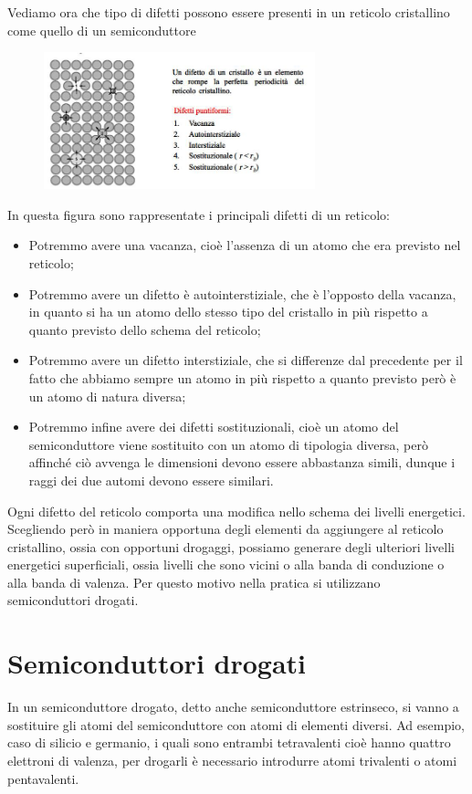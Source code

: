 \vspace{0.2cm}Vediamo ora che tipo di difetti possono essere presenti in un reticolo cristallino come quello di un semiconduttore
\begin{figure}[H]
   \centering
   \includegraphics[width=0.7\textwidth]{immagini/difetti_cristallini.png}
\end{figure}
In questa figura sono rappresentate i principali difetti di un reticolo:
\begin{itemize}[leftmargin=0.5cm]
   \item Potremmo avere una vacanza, cioè l'assenza di un atomo che era previsto nel reticolo;
   \item Potremmo avere un difetto è autointerstiziale, che è l'opposto della vacanza, in quanto si ha un atomo dello stesso tipo del cristallo in più rispetto a quanto previsto dello schema del reticolo;
   \item Potremmo avere un difetto interstiziale, che si differenze dal precedente per il fatto che abbiamo sempre un atomo in più rispetto a quanto previsto però è un atomo di natura diversa;
   \item Potremmo infine avere dei difetti sostituzionali, cioè un atomo del semiconduttore viene sostituito con un atomo di tipologia diversa, però affinché ciò avvenga le dimensioni devono essere abbastanza simili, dunque i raggi dei due automi devono essere similari.
\end{itemize}
Ogni difetto del reticolo comporta una modifica nello schema dei livelli energetici. Scegliendo però in maniera opportuna degli elementi da aggiungere al reticolo cristallino, ossia con opportuni drogaggi, possiamo generare degli ulteriori livelli energetici superficiali, ossia livelli che sono vicini o alla banda di conduzione o alla banda di valenza. Per questo motivo nella pratica si utilizzano semiconduttori drogati.

\section{Semiconduttori drogati}
In un semiconduttore drogato, detto anche semiconduttore estrinseco, si vanno a sostituire gli atomi del semiconduttore con atomi di elementi diversi. Ad esempio, caso di silicio e germanio, i quali sono entrambi tetravalenti cioè hanno quattro elettroni di valenza, per drogarli è necessario introdurre atomi trivalenti o atomi pentavalenti.

